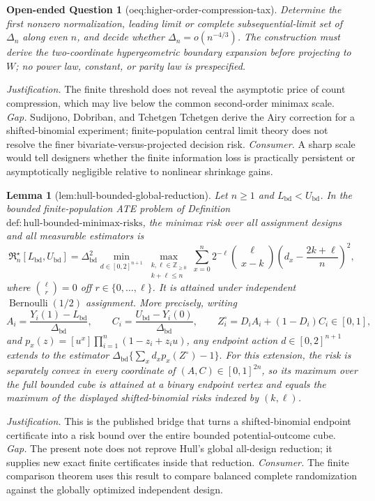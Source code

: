 \documentclass{article}
\newtheorem{lemma}{Lemma}
\newtheorem{openendedquestion}{Open-ended Question}
\begin{document}
\begin{openendedquestion}[oeq:higher-order-compression-tax]\label{oeq:higher-order-compression-tax}
Determine the first nonzero normalization, leading limit or complete subsequential-limit set of \(\Delta_n\) along even \(n\), and decide whether \(\Delta_n=o(n^{-4/3})\). The construction must derive the two-coordinate hypergeometric boundary expansion before projecting to \(W\); no power law, constant, or parity law is prespecified.
\end{openendedquestion}
\par\smallskip\noindent \textit{Justification.} The finite threshold does not reveal the asymptotic price of count compression, which may live below the common second-order minimax scale. \textit{Gap.} Sudijono, Dobriban, and Tchetgen Tchetgen derive the Airy correction for a shifted-binomial experiment; finite-population central limit theory does not resolve the finer bivariate-versus-projected decision risk. \textit{Consumer.} A sharp scale would tell designers whether the finite information loss is practically persistent or asymptotically negligible relative to nonlinear shrinkage gains.

\begin{lemma}[lem:hull-bounded-global-reduction]\label{lem:hull-bounded-global-reduction}
Let \(n\geq1\) and \(L_{\mathrm{bd}}<U_{\mathrm{bd}}\).  In the bounded finite-population ATE problem of Definition \(\mathrm{def{:}hull\mbox{-}bounded\mbox{-}minimax\mbox{-}risks}\), the minimax risk over all assignment designs and all measurable estimators is
\[
 \mathfrak R_n^\star[L_{\mathrm{bd}},U_{\mathrm{bd}}]
 =\Delta_{\mathrm{bd}}^2
 \min_{d\in[0,2]^{n+1}}
 \max_{\substack{k,\ell\in\mathbb Z_{\geq0}\\k+\ell\leq n}}
 \sum_{x=0}^n2^{-\ell}\binom{\ell}{x-k}
 \left(d_x-\frac{2k+\ell}{n}\right)^2,
\]
where \(\binom\ell r=0\) off \(r\in\{0,\ldots,\ell\}\).  It is attained under independent \(\operatorname{Bernoulli}(1/2)\) assignment.  More precisely, writing
\[
 A_i=\frac{Y_i(1)-L_{\mathrm{bd}}}{\Delta_{\mathrm{bd}}},\qquad
 C_i=\frac{U_{\mathrm{bd}}-Y_i(0)}{\Delta_{\mathrm{bd}}},\qquad
 Z_i^\circ=D_iA_i+(1-D_i)C_i\in[0,1],
\]
and \(p_x(z)=[u^x]\prod_{i=1}^n(1-z_i+z_i u)\), any endpoint action \(d\in[0,2]^{n+1}\) extends to the estimator
\(
 \Delta_{\mathrm{bd}}\{\sum_xd_xp_x(Z^\circ)-1\}.
\)
For this extension, the risk is separately convex in every coordinate of \((A,C)\in[0,1]^{2n}\), so its maximum over the full bounded cube is attained at a binary endpoint vertex and equals the maximum of the displayed shifted-binomial risks indexed by \((k,\ell)\).
\end{lemma}
\par\smallskip\noindent \textit{Justification.} This is the published bridge that turns a shifted-binomial endpoint certificate into a risk bound over the entire bounded potential-outcome cube. \textit{Gap.} The present note does not reprove Hull's global all-design reduction; it supplies new exact finite certificates inside that reduction. \textit{Consumer.} The finite comparison theorem uses this result to compare balanced complete randomization against the globally optimized independent design.
\end{document}
